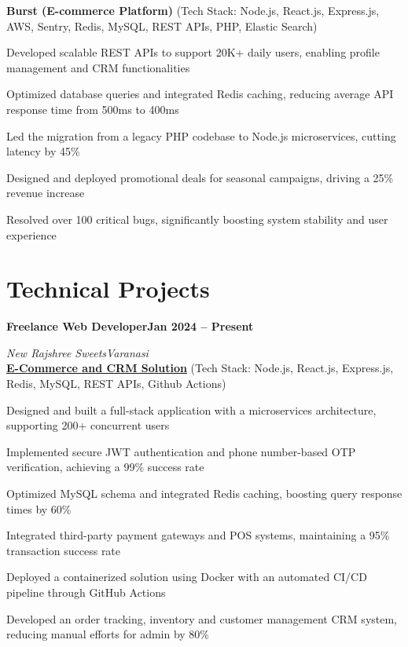 \documentclass[letterpaper,10pt]{article}
\newcommand{\heading}[2]{
  \hspace{6pt}#1\hfill#2\\[0.8pt]
}
\newcommand{\headingBf}[2]{
  \heading{\textbf{#1}}{\textbf{#2}}
}
\newcommand{\headingIt}[2]{
  \heading{\textit{#1}}{\textit{#2}}
}
\newenvironment{resume_list}{
  \vspace{-5pt}
  \begin{itemize}[itemsep=-3pt, parsep=0.2pt, leftmargin=20pt]
}{
  \end{itemize}
  \vspace{-4pt}
}
\begin{document}
\hspace{10pt}\textbf{Burst (E-commerce Platform)} \small{(Tech Stack: Node.js, React.js, Express.js, AWS, Sentry, Redis, MySQL, REST APIs, PHP, Elastic Search)}
\vspace{1pt}
\begin{resume_list}
    \item Developed scalable REST APIs to support 20K+ daily users, enabling profile management and CRM functionalities
    \item Optimized database queries and integrated Redis caching, reducing average API response time from 500ms to 400ms
    \item Led the migration from a legacy PHP codebase to Node.js microservices, cutting latency by 45\%
    \item Designed and deployed promotional deals for seasonal campaigns, driving a 25\% revenue increase
    \item Resolved over 100 critical bugs, significantly boosting system stability and user experience
\end{resume_list}
\vspace{4pt}

\section{Technical Projects}
\headingBf{Freelance Web Developer}{Jan 2024 -- Present}
\vspace{2pt}
\headingIt{New Rajshree Sweets}{Varanasi}
\vspace{3pt}
\hspace{10pt}\textbf{\href{https://newrajshreesweets.com}{\underline{E-Commerce and CRM Solution}}} \small{(Tech Stack: Node.js, React.js, Express.js, Redis, MySQL, REST APIs, Github Actions)}
\vspace{1pt}
\begin{resume_list}
    \item Designed and built a full-stack application with a microservices architecture, supporting 200+ concurrent users
    \item Implemented secure JWT authentication and phone number-based OTP verification, achieving a 99\% success rate
    \item Optimized MySQL schema and integrated Redis caching, boosting query response times by 60\%
    \item Integrated third-party payment gateways and POS systems, maintaining a 95\% transaction success rate
    \item Deployed a containerized solution using Docker with an automated CI/CD pipeline through GitHub Actions
    \item Developed an order tracking, inventory and customer management CRM system, reducing manual efforts for admin by 80\%
\end{resume_list}
\end{document}
